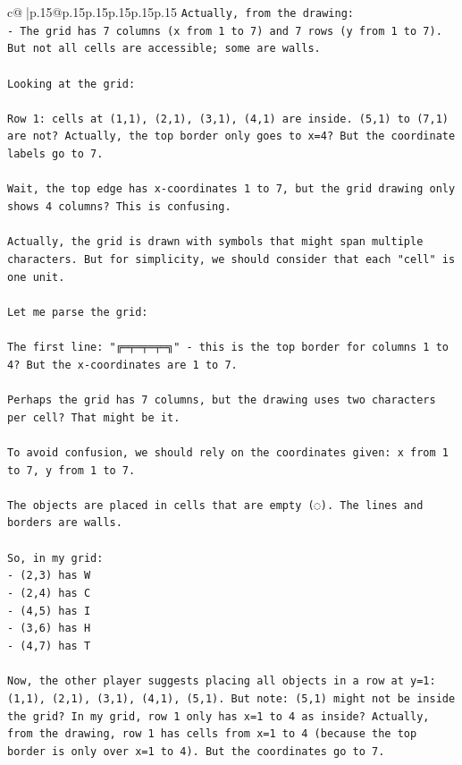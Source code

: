 \documentclass{article}
\begin{document}
{\begin{supertabular}{c@{$\;$}|p{.15\linewidth}@{}p{.15\linewidth}p{.15\linewidth}p{.15\linewidth}p{.15\linewidth}p{.15\linewidth}}
{{{\texttt{Actually, from the drawing:} \\
\texttt{{-} The grid has 7 columns (x from 1 to 7) and 7 rows (y from 1 to 7). But not all cells are accessible; some are walls.} \\
\\ 
\texttt{Looking at the grid:} \\
\\ 
\texttt{Row 1: cells at (1,1), (2,1), (3,1), (4,1) are inside. (5,1) to (7,1) are not? Actually, the top border only goes to x=4? But the coordinate labels go to 7.} \\
\\ 
\texttt{Wait, the top edge has x{-}coordinates 1 to 7, but the grid drawing only shows 4 columns? This is confusing.} \\
\\ 
\texttt{Actually, the grid is drawn with symbols that might span multiple characters. But for simplicity, we should consider that each "cell" is one unit.} \\
\\ 
\texttt{Let me parse the grid:} \\
\\ 
\texttt{The first line: "╔═╤═╤═╤═╗" {-} this is the top border for columns 1 to 4? But the x{-}coordinates are 1 to 7.} \\
\\ 
\texttt{Perhaps the grid has 7 columns, but the drawing uses two characters per cell? That might be it.} \\
\\ 
\texttt{To avoid confusion, we should rely on the coordinates given: x from 1 to 7, y from 1 to 7.} \\
\\ 
\texttt{The objects are placed in cells that are empty (◌). The lines and borders are walls.} \\
\\ 
\texttt{So, in my grid:} \\
\texttt{{-} (2,3) has W} \\
\texttt{{-} (2,4) has C} \\
\texttt{{-} (4,5) has I} \\
\texttt{{-} (3,6) has H} \\
\texttt{{-} (4,7) has T} \\
\\ 
\texttt{Now, the other player suggests placing all objects in a row at y=1: (1,1), (2,1), (3,1), (4,1), (5,1). But note: (5,1) might not be inside the grid? In my grid, row 1 only has x=1 to 4 as inside? Actually, from the drawing, row 1 has cells from x=1 to 4 (because the top border is only over x=1 to 4). But the coordinates go to 7.} \\
}}}
\end{supertabular}}
\end{document}
